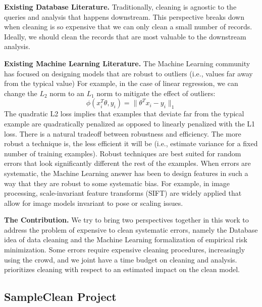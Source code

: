 \vspace{0.5em}

\noindent\textbf{Existing Database Literature. } 
Traditionally, cleaning is agnostic to the queries and analysis that happens downstream. 
This perspective breaks down when cleaning is so expensive that we can only clean a small number of records.
Ideally, we should clean the records that are most valuable to the downstream analysis.

\vspace{0.5em}

\noindent\textbf{Existing  Machine Learning Literature. } The Machine Learning community has focused on
designing models that are robust to outliers (i.e., values far away from the typical value)
For example, in the case of linear regression, we can change the $L_2$ norm to an $L_1$ norm to mitigate the effect of outliers:
\[
\phi(x_{i}^T\theta,y_{i}) = \|\theta^Tx_{i} - y_i \|_1
\]
The quadratic L2 loss implies that examples that deviate far from the typical example are quadratically penalized as opposed to linearly penalized with the L1 loss.
There is a natural tradeoff between robustness and efficiency.
The more robust a technique is, the less efficient it will be (i.e., estimate variance for a fixed number of training examples).
Robust techniques are best suited for random errors that look significantly different the rest of the examples.
When errors are systematic, the Machine Learning answer has been to design features in such a way that they are robust to some systematic bias.
For example, in image processing, scale-invariant feature transforms (SIFT) are widely applied that allow for image models invariant to pose or scaling issues.

\vspace{0.5em}

\noindent\textbf{The \sys Contribution. } We try to bring two perspectives together in this work to address the problem of expensive to clean systematic errors, namely the Database idea of data cleaning and the Machine Learning formalization of empirical risk minimization.
Some errors require expensive cleaning procedures, increasingly using the crowd, and we joint have a time budget on cleaning and analysis.
\sys prioritizes cleaning with respect to an estimated impact on the clean model.



\subsection{SampleClean Project}

